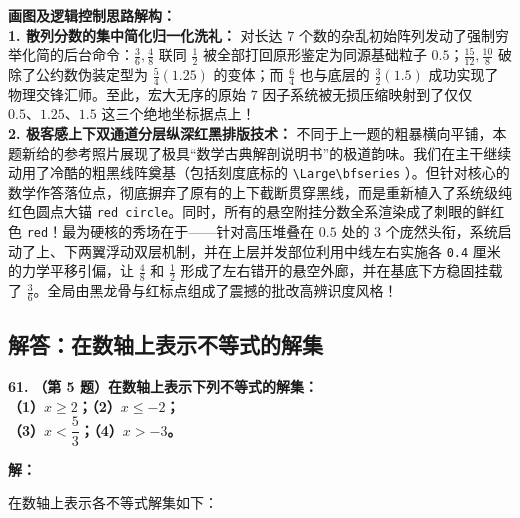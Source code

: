 \vspace{0.4cm}
{\small\color{blue!70!black}
\textbf{画图及逻辑控制思路解构：}\\
\textbf{1. 散列分数的集中简化归一化洗礼：} 对长达 $7$ 个数的杂乱初始阵列发动了强制穷举化简的后台命令：$\frac{3}{6}, \frac{4}{8}$ 联同 $\frac{1}{2}$ 被全部打回原形鉴定为同源基础粒子 $0.5$；$\frac{15}{12}, \frac{10}{8}$ 破除了公约数伪装定型为 $\frac{5}{4} (1.25)$ 的变体；而 $\frac{6}{4}$ 也与底层的 $\frac{3}{2} (1.5)$ 成功实现了物理交锋汇师。至此，宏大无序的原始 $7$ 因子系统被无损压缩映射到了仅仅 $0.5、 1.25、 1.5$ 这三个绝地坐标据点上！\\
\textbf{2. 极客感上下双通道分层纵深红黑排版技术：} 不同于上一题的粗暴横向平铺，本题新给的参考照片展现了极具“数学古典解剖说明书”的极道韵味。我们在主干继续动用了冷酷的粗黑线阵奠基（包括刻度底标的 \texttt{\textbackslash{}Large\textbackslash{}bfseries} ）。但针对核心的数学作答落位点，彻底摒弃了原有的上下截断贯穿黑线，而是重新植入了系统级纯红色圆点大锚 \texttt{red circle}。同时，所有的悬空附挂分数全系渲染成了刺眼的鲜红色 \texttt{red}！最为硬核的秀场在于——针对高压堆叠在 $0.5$ 处的 $3$ 个庞然头衔，系统启动了上、下两翼浮动双层机制，并在上层并发部位利用中线左右实施各 \texttt{0.4} 厘米的力学平移引偏，让 $\frac{4}{8}$ 和 $\frac{1}{2}$ 形成了左右错开的悬空外廊，并在基底下方稳固挂载了 $\frac{3}{6}$。全局由黑龙骨与红标点组成了震撼的批改高辨识度风格！
}

\newpage

\newpage

\subsection{解答：在数轴上表示不等式的解集}

\vspace{0.6cm}

\textbf{\LARGE 61.} \textbf{（第 5 题）在数轴上表示下列不等式的解集：\\
（1）$x \geqslant 2$；\qquad\quad （2）$x \leqslant -2$；\\
（3）$x < \dfrac{5}{3}$；\qquad\quad （4）$x > -3$。}

\vspace{0.4cm}
\textbf{解：}

在数轴上表示各不等式解集如下：

\vspace{0.4cm}

